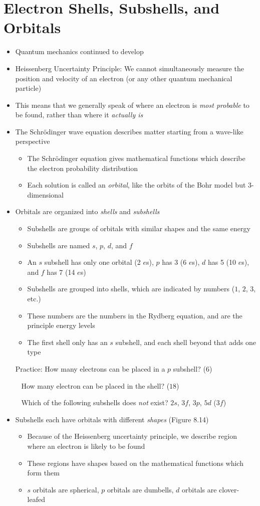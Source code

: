 \documentclass[12pt, openany, letterpaper]{memoir}
\begin{document}
\section{Electron Shells, Subshells, and Orbitals}
\begin{itemize}
	\item Quantum mechanics continued to develop
	\item Heissenberg Uncertainty Principle: We cannot simultaneously measure the position and velocity of an electron (or any other quantum mechanical particle)
	\item This means that we generally speak of where an electron is \emph{most probable} to be found, rather than where it \emph{actually is}
	\item The Schr\"odinger wave equation describes matter starting from a wave-like perspective
	\begin{itemize}
		\item The Schr\"odinger equation gives mathematical functions which describe the electron probability distribution
		\item Each solution is called an \emph{orbital}, like the orbits of the Bohr model but 3-dimensional
	\end{itemize}
	\item Orbitals are organized into \emph{shells} and \emph{subshells}
	\begin{itemize}
		\item Subshells are groups of orbitals with similar shapes and the same energy
		\item Subshells are named $s$, $p$, $d$, and $f$
		\item An $s$ subshell has only one orbital (2 $e$s), $p$ has 3 (6 $e$s), $d$ has 5 (10 $e$s), and $f$ has 7 (14 $e$s)
		\item Subshells are grouped into shells, which are indicated by numbers ($1$, $2$, $3$, etc.)
		\item These numbers are the numbers in the Rydberg equation, and are the principle energy levels
		\item The first shell only has an $s$ subshell, and each shell beyond that adds one type		
	\end{itemize}
	Practice: How many electrons can be placed in a $p$ subshell? ($6$)
	
	~\hphantom{Practice:} How many electron can be placed in the  shell? ($18$)
	
	~\hphantom{Practice:} Which of the following subshells does \emph{not} exist? $2s$, $3f$, $3p$, $5d$ ($3f$)
	\item Subshells each have orbitals with different \emph{shapes} (Figure 8.14)
	\begin{itemize}
		\item Because of the Heissenberg uncertainty principle, we describe region where an electron is likely to be found
		\item These regions have shapes based on the mathematical functions which form them
		\item $s$ orbitals are spherical, $p$ orbitals are dumbells, $d$ orbitals are clover-leafed 
	\end{itemize}
\end{itemize}
\end{document}
